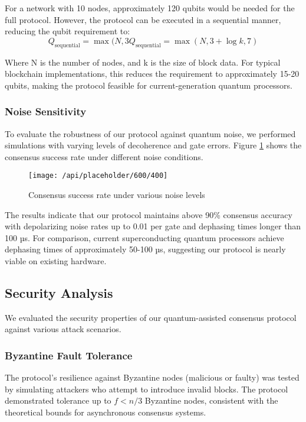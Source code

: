 \documentclass[11pt,a4paper]{article}
\begin{document}
For a network with 10 nodes, approximately 120 qubits would be needed for the full protocol. However, the protocol can be executed in a sequential manner, reducing the qubit requirement to:
\begin{equation}
Q_{\text{sequential}} = \max(N, 3Q_{\text{sequential}} = \max(N, 3 + \log k, 7)
\end{equation}

Where N is the number of nodes, and k is the size of block data. For typical blockchain implementations, this reduces the requirement to approximately 15-20 qubits, making the protocol feasible for current-generation quantum processors.

\subsubsection{Noise Sensitivity}
To evaluate the robustness of our protocol against quantum noise, we performed simulations with varying levels of decoherence and gate errors. Figure \ref{fig:noise} shows the consensus success rate under different noise conditions.

\begin{figure}[H]
\centering
\texttt{[image: /api/placeholder/600/400]}
\caption{Consensus success rate under various noise levels}
\label{fig:noise}
\end{figure}

The results indicate that our protocol maintains above 90\% consensus accuracy with depolarizing noise rates up to 0.01 per gate and dephasing times longer than 100 µs. For comparison, current superconducting quantum processors achieve dephasing times of approximately 50-100 µs, suggesting our protocol is nearly viable on existing hardware.

\subsection{Security Analysis}
We evaluated the security properties of our quantum-assisted consensus protocol against various attack scenarios.

\subsubsection{Byzantine Fault Tolerance}
The protocol's resilience against Byzantine nodes (malicious or faulty) was tested by simulating attackers who attempt to introduce invalid blocks. The protocol demonstrated tolerance up to $f < n/3$ Byzantine nodes, consistent with the theoretical bounds for asynchronous consensus systems.
\end{document}

